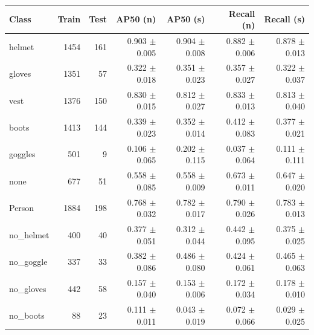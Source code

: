 \begin{tabular}{lrrrrrr}
\toprule
Class & Train & Test & AP50 (n) & AP50 (s) & Recall (n) & Recall (s) \\
\midrule
helmet & 1454 & 161 & 0.903 $\pm$ 0.005 & 0.904 $\pm$ 0.008 & 0.882 $\pm$ 0.006 & 0.878 $\pm$ 0.013 \\
gloves & 1351 & 57 & 0.322 $\pm$ 0.018 & 0.351 $\pm$ 0.023 & 0.357 $\pm$ 0.027 & 0.322 $\pm$ 0.037 \\
vest & 1376 & 150 & 0.830 $\pm$ 0.015 & 0.812 $\pm$ 0.027 & 0.833 $\pm$ 0.013 & 0.813 $\pm$ 0.040 \\
boots & 1413 & 144 & 0.339 $\pm$ 0.023 & 0.352 $\pm$ 0.014 & 0.412 $\pm$ 0.083 & 0.377 $\pm$ 0.021 \\
goggles & 501 & 9 & 0.106 $\pm$ 0.065 & 0.202 $\pm$ 0.115 & 0.037 $\pm$ 0.064 & 0.111 $\pm$ 0.111 \\
none & 677 & 51 & 0.558 $\pm$ 0.085 & 0.558 $\pm$ 0.009 & 0.673 $\pm$ 0.011 & 0.647 $\pm$ 0.020 \\
Person & 1884 & 198 & 0.768 $\pm$ 0.032 & 0.782 $\pm$ 0.017 & 0.790 $\pm$ 0.026 & 0.783 $\pm$ 0.013 \\
no\_helmet & 400 & 40 & 0.377 $\pm$ 0.051 & 0.312 $\pm$ 0.044 & 0.442 $\pm$ 0.095 & 0.375 $\pm$ 0.025 \\
no\_goggle & 337 & 33 & 0.382 $\pm$ 0.086 & 0.486 $\pm$ 0.080 & 0.424 $\pm$ 0.061 & 0.465 $\pm$ 0.063 \\
no\_gloves & 442 & 58 & 0.157 $\pm$ 0.040 & 0.153 $\pm$ 0.006 & 0.172 $\pm$ 0.034 & 0.178 $\pm$ 0.010 \\
no\_boots & 88 & 23 & 0.111 $\pm$ 0.011 & 0.043 $\pm$ 0.019 & 0.072 $\pm$ 0.066 & 0.029 $\pm$ 0.025 \\
\bottomrule
\end{tabular}
